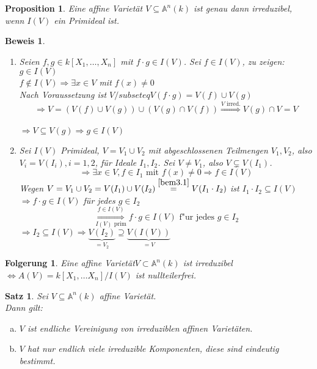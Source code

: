\documentclass[a4paper,12pt]{report}
\theoremstyle{break}
\newtheorem{Satz}{Satz}
\newtheorem{Prop}[Def]{Proposition}
\newtheorem{Folg}[Def]{Folgerung}
\theoremstyle{nonumberbreak}
\newtheorem{Bew}{Beweis}
\theoremstyle{nonumberplain}
\newcommand{\quot}[1]{\textrm{\glqq}{#1}\textrm{\grqq}}
\newenvironment{twosidedproof}{\begin{enumerate}[\quot{$\Rightarrow$}:]}{\end{enumerate}}
\newcommand{\proofforward}{\item[\quot{$\Rightarrow$}:]}
\newcommand{\proofreverse}{\item[\quot{$\Leftarrow$}:]}
\newcommand{\A}{\mathbb{A}}
\begin{document}
\begin{Prop}
Eine affine Variet\"at $V\subseteq \A ^n(k)$ ist genau dann irreduzibel, wenn $I(V)$ ein Primideal ist.
\end{Prop}

\begin{Bew}\begin{twosidedproof}
\proofforward
Seien $f,g\in k[X_1,\dots ,X_n]$ mit $f\cdot g \in I(V)$. Sei $f\in I(V)$, zu zeigen: $g\in I(V)$\\
$f\notin I(V) \Rightarrow \exists x\in V$ mit $f(x) \not= 0$\\
Nach Voraussetzung ist $V/subseteq V(f\cdot g) = V(f)\cup V(g)$\\
\[\Rightarrow V=\left(V(f)\cup V(g)\right) \cup \left(V(g)\cap V(f)\right) \stackrel{V \textrm{ irred.}}\Rightarrow V(g)\cap V = V\]\\
$\Rightarrow V\subseteq V(g) \Rightarrow g\in I(V)$

\proofreverse
Sei $I(V)$ Primideal, $V=V_1\cup V_2$ mit abgeschlossenen Teilmengen $V_1,V_2$, also $V_i=V(I_i), i=1,2$, f\"ur Ideale $I_1,I_2$. Sei $V\not= V_1$, also $V\subsetneq V(I_1)$.
\[\Rightarrow \exists x\in V, f\in I_1 \textrm{ mit } f(x) \neq 0 \Rightarrow f\in I(V)\]
Wegen $V= V_1 \cup V_2=V(I_1)\cup V(I_2) \stackrel{\autoref{bem3.1}}=V(I_1\cdot I_2)$ ist $I_1\cdot I_2 \subseteq I(V)$\\
$\Rightarrow f\cdot g \in I(V)$ f\"ur jedes $g\in I_2$
\[\overset{f\in I(V)}{\underset{I(V) \textrm{ prim}}{\Rightarrow}} f\cdot g \in I(V) \textrm{ f"ur jedes }g \in I_2\]
$\Rightarrow I_2\subseteq I(V) \Rightarrow \underbrace{V(I_2)}_{=V_2} \supseteq \underbrace{V(I(V))}_{=V}$
\end{twosidedproof}\end{Bew}

\begin{Folg}
Eine affine Variet\"at$V\subset \A ^n(k)$ ist irreduzibel $\Leftrightarrow A(V) =k[X_1,\dots X_n]/I(V)$ ist nullteilerfrei.
\end{Folg}

\begin{Satz}
Sei $V\subseteq \A ^n(k)$ affine Variet\"at.\\
Dann gilt:\begin{enumerate}[a)]
\item
	$V$ ist endliche Vereinigung von irreduziblen affinen Variet\"aten.
\item
	$V$ hat nur endlich viele irreduzible Komponenten, diese sind eindeutig bestimmt.
\end{enumerate}\end{Satz}
\end{document}
